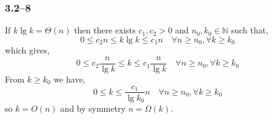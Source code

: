 \subsubsection*{3.2--8}

If $k\lg k = \Theta(n)$ then there exists $c_{1},c_{2}>0$ and $n_{0},k_{0}\in\mathbb{N}$ such that,
\begin{equation*}
	0\leq c_{2}n\leq k\lg k \leq c_{1}n\quad\forall n\geq n_{0}, \forall k\geq k_{0}
\end{equation*}
which gives,
\begin{equation*}
	0 \leq c_{2}\frac{n}{\lg k}\leq k \leq c_{1}\frac{n}{\lg k}\quad\forall n\geq n_{0}, \forall k\geq k_{0}
\end{equation*}
From $k\geq k_{0}$ we have,
\begin{equation*}
	0 \leq k \leq \frac{c_{1}}{\lg k_{0}}n\quad\forall n\geq n_{0}, \forall k\geq k_{0}
\end{equation*}
so $k = O(n)$ and by symmetry $n = \Omega(k)$.
